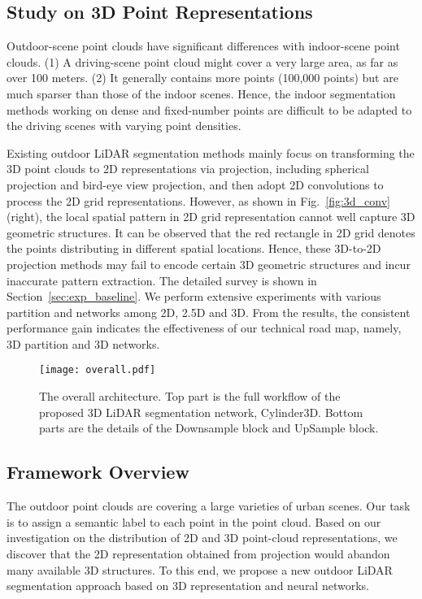 \documentclass{article}
\begin{document}
\subsection{Study on 3D Point Representations}

Outdoor-scene point clouds have significant differences with indoor-scene point clouds. (1) A {driving-scene} point cloud might cover a very large area, as far as over 100 meters. (2) It generally contains more points (100,000 points) but are much sparser than those of the indoor scenes. Hence, the indoor segmentation methods working on dense and fixed-number points {are} difficult to be adapted to the driving scenes with varying point densities.

Existing outdoor LiDAR segmentation methods mainly focus on transforming the 3D point clouds to 2D representations via projection, including spherical projection and bird-eye view projection, and then adopt 2D convolutions to process the 2D grid representations. However, as shown in Fig.~\ref{fig:3d_conv}(right), the local spatial pattern in 2D grid representation cannot well capture 3D geometric structures. It can be observed that the red rectangle in 2D grid denotes the points distributing in different spatial locations.
Hence, these 3D-to-2D projection methods may fail to encode certain 3D geometric structures and incur inaccurate pattern extraction. The detailed survey is shown in Section~\ref{sec:exp_baseline}. We perform extensive experiments with various partition and networks among 2D, 2.5D and 3D.
From the results, the consistent performance gain indicates the effectiveness of our technical road map, namely, 3D partition and 3D networks.


    \begin{figure*}
    \centering
    \texttt{[image: overall.pdf]}
    \caption{The overall architecture. Top part is the full workflow of the proposed 3D LiDAR segmentation network, Cylinder3D. Bottom parts are the details of the Downsample block and UpSample block.}
    \label{fig:overall}
    \end{figure*}

\subsection{Framework Overview}

The outdoor point clouds are covering a large varieties of urban scenes. Our task is to assign a semantic label to each point in the point cloud. Based on our investigation on the distribution of 2D and 3D point-cloud representations, we discover that the 2D representation obtained from projection would abandon many available 3D structures. To this end, we propose a new outdoor LiDAR segmentation approach based on 3D representation and neural networks. 
\end{document}
